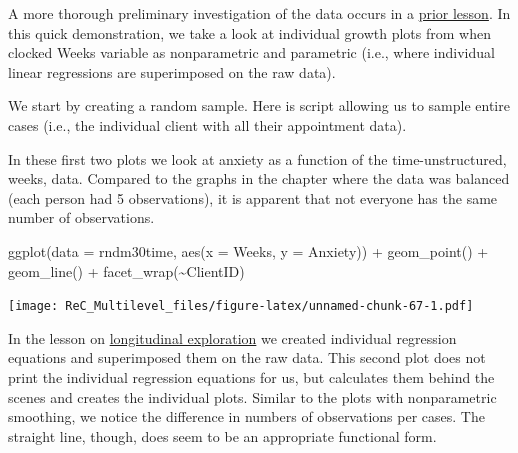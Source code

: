 \documentclass[
  english,
]{book}
\newenvironment{Shaded}{\begin{snugshade}}{\end{snugshade}}
\newcommand{\AttributeTok}[1]{\textcolor[rgb]{0.77,0.63,0.00}{#1}}
\newcommand{\DecValTok}[1]{\textcolor[rgb]{0.00,0.00,0.81}{#1}}
\newcommand{\FunctionTok}[1]{\textcolor[rgb]{0.00,0.00,0.00}{#1}}
\newcommand{\NormalTok}[1]{#1}
\newcommand{\OtherTok}[1]{\textcolor[rgb]{0.56,0.35,0.01}{#1}}
\newcommand{\SpecialCharTok}[1]{\textcolor[rgb]{0.00,0.00,0.00}{#1}}
\begin{document}
A more thorough preliminary investigation of the data occurs in a \protect\hyperlink{MLMexplore}{prior lesson}. In this quick demonstration, we take a look at individual growth plots from when clocked Weeks variable as nonparametric and parametric (i.e., where individual linear regressions are superimposed on the raw data).

We start by creating a random sample. Here is script allowing us to sample entire cases (i.e., the individual client with all their appointment data).

\begin{Shaded}
\end{Shaded}

In these first two plots we look at anxiety as a function of the time-unstructured, weeks, data. Compared to the graphs in the chapter where the data was balanced (each person had 5 observations), it is apparent that not everyone has the same number of observations.

\begin{Shaded}
\begin{Highlighting}[]
\FunctionTok{ggplot}\NormalTok{(}\AttributeTok{data =}\NormalTok{ rndm30time, }\FunctionTok{aes}\NormalTok{(}\AttributeTok{x =}\NormalTok{ Weeks, }\AttributeTok{y =}\NormalTok{ Anxiety)) }\SpecialCharTok{+} \FunctionTok{geom\_point}\NormalTok{() }\SpecialCharTok{+} \FunctionTok{geom\_line}\NormalTok{() }\SpecialCharTok{+}
    \FunctionTok{facet\_wrap}\NormalTok{(}\SpecialCharTok{\textasciitilde{}}\NormalTok{ClientID)}
\end{Highlighting}
\end{Shaded}

\texttt{[image: ReC\_Multilevel\_files/figure-latex/unnamed-chunk-67-1.pdf]}

In the lesson on \href{MLMexplore}{longitudinal exploration} we created individual regression equations and superimposed them on the raw data. This second plot does not print the individual regression equations for us, but calculates them behind the scenes and creates the individual plots. Similar to the plots with nonparametric smoothing, we notice the difference in numbers of observations per cases. The straight line, though, does seem to be an appropriate functional form.
\end{document}
